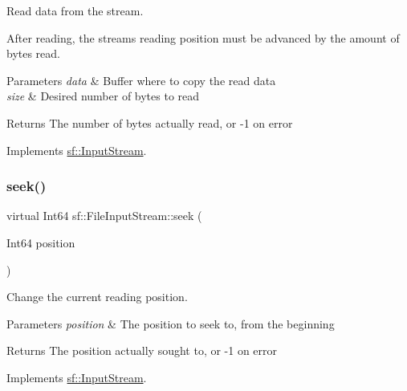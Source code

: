 Read data from the stream. 

After reading, the stream\textquotesingle{}s reading position must be advanced by the amount of bytes read.


\begin{DoxyParams}{Parameters}
{\em data} & Buffer where to copy the read data \\
\hline
{\em size} & Desired number of bytes to read\\
\hline
\end{DoxyParams}
\begin{DoxyReturn}{Returns}
The number of bytes actually read, or -\/1 on error 
\end{DoxyReturn}


Implements \hyperlink{classsf_1_1_input_stream_a8dd89c74c1acb693203f50e750c6ae53}{sf\+::\+Input\+Stream}.

\mbox{\label{classsf_1_1_file_input_stream_abdaf5700d4e1de07568e7829106b4eb9}} 
\subsubsection{\texorpdfstring{seek()}{seek()}}
{\footnotesize\ttfamily virtual Int64 sf\+::\+File\+Input\+Stream\+::seek (\begin{DoxyParamCaption}\item[{Int64}]{position }\end{DoxyParamCaption})\hspace{0.3cm}{\ttfamily [virtual]}}



Change the current reading position. 


\begin{DoxyParams}{Parameters}
{\em position} & The position to seek to, from the beginning\\
\hline
\end{DoxyParams}
\begin{DoxyReturn}{Returns}
The position actually sought to, or -\/1 on error 
\end{DoxyReturn}


Implements \hyperlink{classsf_1_1_input_stream_a76aba8e5d5cf9b1c5902d5e04f7864fc}{sf\+::\+Input\+Stream}.

\mbox{\label{classsf_1_1_file_input_stream_a768c5fdb3be79e2d71d1bce911f8741c}} 
